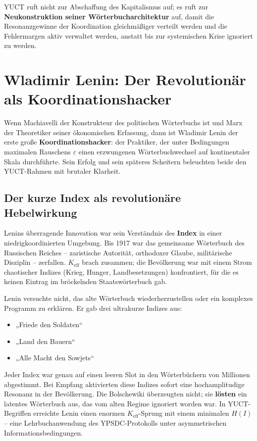 \documentclass[12pt,a4paper]{article}
\newcommand{\Keff}{K_{\mathrm{eff}}}
\begin{document}
YUCT ruft nicht zur Abschaffung des Kapitalismus auf; es ruft zur \textbf{Neukonstruktion seiner Wörterbucharchitektur} auf, damit die Resonanzgewinne der Koordination gleichmäßiger verteilt werden und die Fehlermargen aktiv verwaltet werden, anstatt bis zur systemischen Krise ignoriert zu werden.

\section{Wladimir Lenin: Der Revolutionär als Koordinationshacker}
\label{sec:lenin}

Wenn Machiavelli der Konstrukteur des politischen Wörterbuchs ist und Marx der Theoretiker seiner ökonomischen Erfassung, dann ist Wladimir Lenin der erste große \textbf{Koordinationshacker}: der Praktiker, der unter Bedingungen maximalen Rauschens \(\varepsilon\) einen erzwungenen Wörterbuchwechsel auf kontinentaler Skala durchführte. Sein Erfolg und sein späteres Scheitern beleuchten beide den YUCT-Rahmen mit brutaler Klarheit.

\subsection{Der kurze Index als revolutionäre Hebelwirkung}

Lenins überragende Innovation war sein Verständnis des \textbf{Index} in einer niedrigkoordinierten Umgebung. Bis 1917 war das gemeinsame Wörterbuch des Russischen Reiches – zaristische Autorität, orthodoxer Glaube, militärische Disziplin – zerfallen. \(\Keff\) brach zusammen; die Bevölkerung war mit einem Strom chaotischer Indizes (Krieg, Hunger, Landbesetzungen) konfrontiert, für die es keinen Eintrag im bröckelnden Staatswörterbuch gab.

Lenin versuchte nicht, das alte Wörterbuch wiederherzustellen oder ein komplexes Programm zu erklären. Er gab drei ultrakurze Indizes aus:
\begin{itemize}[leftmargin=*]
	\item „Friede den Soldaten“
	\item „Land den Bauern“
	\item „Alle Macht den Sowjets“
\end{itemize}
Jeder Index war genau auf einen leeren Slot in den Wörterbüchern von Millionen abgestimmt. Bei Empfang aktivierten diese Indizes sofort eine hochamplitudige Resonanz in der Bevölkerung. Die Bolschewiki überzeugten nicht; sie \textbf{lösten} ein latentes Wörterbuch aus, das vom alten Regime ignoriert worden war. In YUCT-Begriffen erreichte Lenin einen enormen \(K_{\mathrm{eff}}\)-Sprung mit einem minimalen \(H(I)\) – eine Lehrbuchanwendung des YPSDC-Protokolls unter asymmetrischen Informationsbedingungen.
\end{document}
